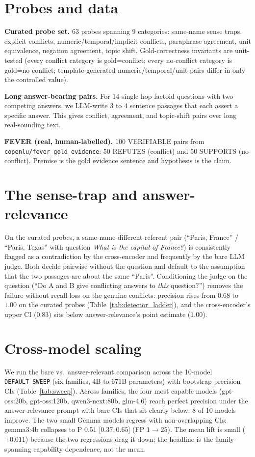 \documentclass[sigconf, nonacm, natbib]{acmart}
\begin{document}
\section{Probes and data}
\label{sec:data}
\textbf{Curated probe set.} 63 probes spanning 9 categories: same-name sense traps,
explicit conflicts, numeric/temporal/implicit conflicts, paraphrase agreement, unit
equivalence, negation agreement, topic shift. Gold-correctness invariants are unit-tested
(every conflict category is gold=conflict; every no-conflict category is
gold=no-conflict; template-generated numeric/temporal/unit pairs differ in only the
controlled value).

\textbf{Long answer-bearing pairs.} For 14 single-hop factoid questions with two
competing answers, we LLM-write 3 to 4 sentence passages that each assert a specific
answer. This gives conflict, agreement, and topic-shift pairs over long real-sounding
text.

\textbf{FEVER (real, human-labelled).} 100 VERIFIABLE pairs from
\texttt{copenlu/fever\_gold\_evidence}: 50 REFUTES (conflict) and 50 SUPPORTS
(no-conflict). Premise is the gold evidence sentence and hypothesis is the claim.

\section{The sense-trap and answer-relevance}
\label{sec:answerrel}
On the curated probes, a same-name-different-referent pair (``Paris, France'' /
``Paris, Texas'' with question \emph{What is the capital of France?}) is consistently
flagged as a contradiction by the cross-encoder and frequently by the bare LLM judge.
Both decide pairwise without the question and default to the assumption that the two
passages are about the same ``Paris''. Conditioning the judge on the question
(``Do A and B give conflicting answers to \emph{this} question?'') removes the failure
without recall loss on the genuine conflicts: precision rises from $0.68$ to $1.00$ on
the curated probes (Table~\ref{tab:detector_ladder}), and the cross-encoder's upper CI
($0.83$) sits below answer-relevance's point estimate ($1.00$).



\section{Cross-model scaling}
\label{sec:sweep}
We run the bare vs.~answer-relevant comparison across the 10-model
\texttt{DEFAULT\_SWEEP} (six families, 4B to 671B parameters) with bootstrap precision
CIs (Table~\ref{tab:sweep}). Across families, the four most capable models
(gpt-oss:20b, gpt-oss:120b, qwen3-next:80b, glm-4.6) reach perfect precision under the
answer-relevance prompt with bare CIs that sit clearly below. 8 of 10 models improve.
The two small Gemma models regress with non-overlapping CIs: gemma3:4b collapses to
P $0.51$ [$0.37, 0.65$] (FP $1{\to}25$). The mean lift is small ($+0.011$) because the
two regressions drag it down; the headline is the family-spanning capability
dependence, not the mean.
\end{document}

